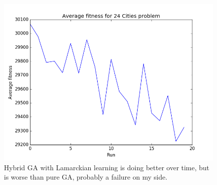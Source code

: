 \documentclass[10pt, a4paper]{article}
\begin{document}
\begin{figure}[h!]\centering
\includegraphics[width = \linewidth]{fitness242} 
\caption{Hybrid GA with Lamarckian learning is doing better over time, but is worse than pure GA, probably a failure on my side.}
\label{fig:time_exhaust}
\end{figure}
\end{document}
